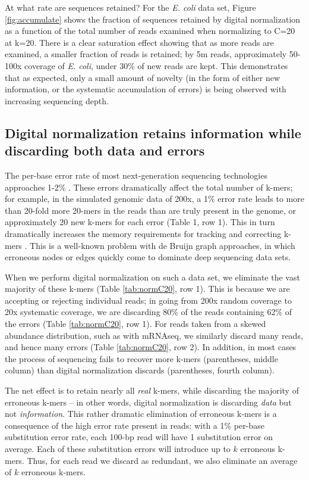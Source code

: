 \documentclass{pnastwo}
\begin{document}
\begin{article}
At what rate are sequences retained?  For the {\em E. coli} data set,
Figure \ref{fig:accumulate} shows the fraction of sequences retained
by digital normalization as a function of the total number of reads
examined when normalizing to C=20 at k=20.  There is a clear
saturation effect showing that as more reads are examined, a smaller
fraction of reads is retained; by 5m reads, approximately 50-100x
coverage of {\em E. coli}, under 30\% of new reads are kept.  This
demonstrates that as expected, only a small amount of novelty (in
the form of either new information, or the systematic accumulation of
errors) is being observed with increasing sequencing depth.


\subsection{Digital normalization retains information while discarding
both data and errors}

The per-base error rate of most next-generation sequencing
technologies approaches 1-2\% \cite{pubmed19997069}.  These errors
dramatically affect the total number of k-mers; for example, in the
simulated genomic data of 200x, a 1\% error rate leads to more than
20-fold more 20-mers in the reads than are truly present in the
genome, or approximately 20 new k-mers for each error (Table 1, row
1).  This in turn dramatically increases the memory requirements for
tracking and correcting k-mers \cite{pubmed21245053}.  This is a
well-known problem with de Bruijn graph approaches, in which erroneous
nodes or edges quickly come to dominate deep sequencing data sets.

When we perform digital normalization on such a data set, we eliminate
the vast majority of these k-mers (Table \ref{tab:normC20}, row 1).
This is because we are accepting or rejecting individual reads; in
going from 200x random coverage to 20x systematic coverage, we are
discarding 80\% of the reads containing 62\% of the errors (Table
\ref{tab:normC20}, row 1).  For reads taken from a skewed abundance
distribution, such as with mRNAseq, we similarly discard many reads,
and hence many errors (Table \ref{tab:normC20}, row 2).  In addition,
in most cases the process of sequencing fails to recover more k-mers
(parentheses, middle column) than digital normalization discards (parentheses,
fourth column).

The net effect is to retain nearly all {\em real} k-mers, while
discarding the majority of erroneous k-mers -- in other words, digital
normalization is discarding {\em data} but not {\em information}.
This rather dramatic elimination of erroneous k-mers is a consequence
of the high error rate present in reads: with a 1\% per-base
substitution error rate, each 100-bp read will have 1 substitution
error on average. Each of these substitution errors will introduce up
to $k$ erroneous k-mers.  Thus, for each read we discard as redundant,
we also eliminate an average of $k$ erroneous k-mers.


\end{article}
\end{document}
